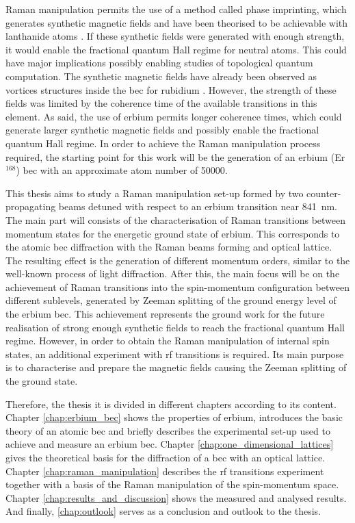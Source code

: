 Raman manipulation permits the use of a method called phase imprinting, which generates synthetic magnetic fields and have been theorised to be achievable with lanthanide atoms \cite{cui2013synthetic}. If these synthetic fields were generated with enough strength, it would enable the fractional quantum Hall regime for neutral atoms. This could have major implications possibly enabling studies of topological quantum computation. The synthetic magnetic fields have already been observed as vortices structures inside the \ac{bec} for rubidium \cite{Lin2009}. However, the strength of these fields was limited by the coherence time of the available transitions in this element. As said, the use of erbium permits longer coherence times, which could generate larger synthetic magnetic fields and possibly enable the fractional quantum Hall regime. In order to achieve the Raman manipulation process required, the starting point for this work will be the generation of an erbium (Er$^\text{168}$) \acf{bec} with an approximate atom number of 50000.

This thesis aims to study a Raman manipulation set-up formed by two counter-propagating beams detuned with respect to an erbium transition near \SI{841}{\nano\meter}. The main part will consists of the characterisation of Raman transitions between momentum states for the energetic ground state of erbium. This corresponds to the atomic \ac{bec} diffraction with the Raman beams forming and optical lattice. The resulting effect is the generation of different momentum orders, similar to the well-known process of light diffraction. After this, the main focus will be on the achievement of Raman transitions into the spin-momentum configuration between different sublevels, generated by Zeeman splitting of the ground energy level of the erbium \ac{bec}. This achievement represents the ground work for the future realisation of strong enough synthetic fields to reach the fractional quantum Hall regime. However, in order to obtain the Raman manipulation of internal spin states, an additional experiment with \ac{rf} transitions is required. Its main purpose is to characterise and prepare the magnetic fields causing the Zeeman splitting of the ground state.

Therefore, the thesis it is divided in different chapters according to its content. Chapter \ref{chap:erbium_bec} shows the properties of erbium, introduces the basic theory of an atomic \ac{bec} and briefly describes the experimental set-up used to achieve and measure an erbium \ac{bec}. Chapter \ref{chap:one_dimensional_lattices} gives the theoretical basis for the diffraction of a \ac{bec} with an optical lattice. Chapter \ref{chap:raman_manipulation} describes the \ac{rf} transitions experiment together with a basis of the Raman manipulation of the spin-momentum space. Chapter \ref{chap:results_and_discussion} shows the measured and analysed results. And finally, \ref{chap:outlook} serves as a conclusion and outlook to the thesis.


